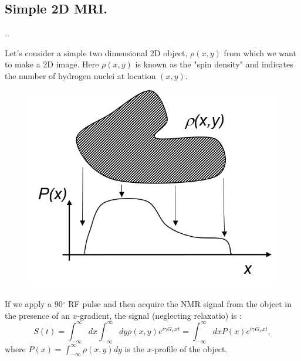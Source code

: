 \documentclass[handout]{beamer}
\begin{document}
\subsection{Simple 2D MRI.}
\begin{frame}{\thesection.\thesubsection. \insertsubsection}
  \begin{minipage}{0.7\textwidth}
  	  Let's consider a simple two dimensional 2D object, $\rho(x,y)$ from which we want to make a 2D image. Here $\rho(x,y)$ is known as the "spin density" and indicates the number of hydrogen nuclei at location $(x,y)$. 
  \end{minipage}
  \begin{minipage}{0.27\textwidth}
	\begin{figure}
		\centering
		\includegraphics[scale=0.4]{figures/simple_2D_mri1.png}
    \end{figure}
  \end{minipage}

  If we apply a 90$^\circ$ RF pulse and then acquire the NMR signal from the object in the presence of an $x$-gradient, the signal (neglecting relaxatio) is :
  \begin{equation}
    S(t) = \int_{- \infty}^{\infty}dx \int_{- \infty}^{\infty}dy \rho(x,y) e^{i \gamma G_x x t} = \int_{- \infty}^{\infty} dx P(x) e^{i \gamma G_x x t},
  \end{equation}
  where $P(x) = \int_{ -\infty}^{\infty} \rho(x,y) dy $ is the $x$-profile of the object.
\end{frame}
\end{document}
